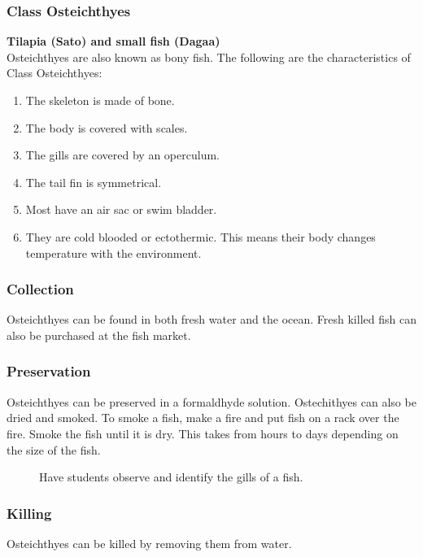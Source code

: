 \subsubsection{Class Osteichthyes}

\textbf{Tilapia (Sato) and small fish (Dagaa)}\\
Osteichthyes are also known as bony fish. The following are the characteristics of Class Osteichthyes:
\begin{enumerate}
\item{The skeleton is made of bone.}
\item{The body is covered with scales.}
\item{The gills are covered by an operculum.}
\item{The tail fin is symmetrical.}
\item{Most have an air sac or swim bladder.}
\item{They are cold blooded or ectothermic. This means their body changes temperature with the environment.}
\end{enumerate}

\subsubsection{Collection}
 Osteichthyes can be found in both fresh water and the ocean. Fresh killed fish can also be purchased at the fish market.

\subsubsection{Preservation} 
Osteichthyes can be preserved in a formaldhyde solution. Ostechithyes can also be dried and smoked. 
To smoke a fish, make a fire and put fish on a rack over the fire. Smoke the fish until it is dry. This takes from hours to days depending on the size of the fish.
\begin{figure}[h]
\begin{center}
\def\svgwidth{6.5cm}

\caption{Have students observe and identify the gills of a fish.}
\label{fig:fish  gills}
\end{center}
\end{figure}

\subsubsection{Killing}
Osteichthyes can be killed by removing them from water. 

